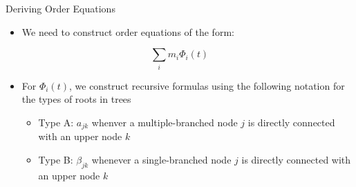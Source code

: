 \documentclass[serif]{beamer}
\begin{document}
\begin{frame}{Deriving Order Equations}
  \begin{itemize}
  \item<1-> We need to construct order equations of the form:
  \end{itemize}

  \begin{equation}
    \nonumber
    \sum_im_i\Phi_i\left(t\right)
  \end{equation}
  \begin{itemize}
  \item<1-> For $\Phi_i\left(t\right)$, we construct recursive formulas using the following notation for the types of roots in trees
      \begin{itemize}
      \item<1-> Type A: $a_{jk}$ whenver a multiple-branched node $j$ is directly connected with an upper node $k$
      \item<1-> Type B: $\beta_{jk}$ whenever a single-branched node $j$ is directly connected with an upper node $k$
      \end{itemize}
  \end{itemize}
  \begin{center}
  \end{center}
\end{frame}
\end{document}
